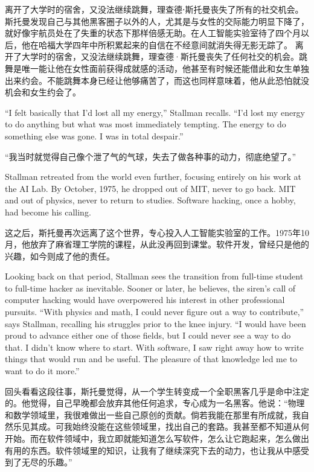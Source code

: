 \ifdefined\chs
\ifdefined\vone
离开了大学时的宿舍，又没法继续跳舞，理查德⋅斯托曼丧失了所有的社交机会。斯托曼发现自己与其他黑客圈子以外的人，尤其是与女性的交际能力明显下降了，就好像宇航员处在了失重的状态下那样倍感无助。在人工智能实验室待了四个月以后，他在哈福大学四年中所积累起来的自信在不经意间就消失得无影无踪了。
\fi
\ifdefined\vtwo
离开了大学时的宿舍，又没法继续跳舞，理查德·斯托曼丧失了任何社交的机会。跳舞是唯一能让他在女性面前获得成就感的活动，他甚至有时候还能借此和女生单独出来约会。不能跳舞本身已经让他够痛苦了，而这也同样意味着，他从此恐怕就没机会和女生约会了。
\fi
\fi

\ifdefined\eng
``I felt basically that I'd lost all my energy,'' Stallman recalls. ``I'd lost my energy to do anything but what was most immediately tempting. The energy to do something else was gone. I was in total despair.''
\fi

\ifdefined\chs
``我当时就觉得自己像个泄了气的气球，失去了做各种事的动力，彻底绝望了。''
\fi

\ifdefined\eng
Stallman retreated from the world even further, focusing entirely on his work at the AI Lab. By October, 1975, he dropped out of \ifdefined\vone MIT, never to go back. \fi\ifdefined\vtwo MIT and out of physics, never to return to studies. \fi Software hacking, once a hobby, had become his calling.
\fi

\ifdefined\chs
这之后，斯托曼再次远离了这个世界，专心投入人工智能实验室的工作。1975年10月，他放弃了麻省理工学院的课程，从此没再回到课堂。软件开发，曾经只是他的兴趣，如今则成了他的责任。
\fi

\ifdefined\eng
Looking back on that period, Stallman sees the transition from full-time student to full-time hacker as inevitable. Sooner or later, he believes, the siren's call of computer hacking would have overpowered his interest in other professional pursuits. ``With physics and math, I could never figure out a way to contribute,'' says Stallman, recalling his struggles prior to the knee injury. ``I would have been proud to advance either one of those fields, but I could never see a way to do that. I didn't know where to start. With software, I saw right away how to write things that would run and be useful. The pleasure of that knowledge led me to want to do it more.''
\fi

\ifdefined\chs
回头看看这段往事，斯托曼觉得，从一个学生转变成一个全职黑客几乎是命中注定的。他觉得，自己早晚都会放弃其他任何追求，专心成为一名黑客。他说：``物理和数学领域里，我很难做出一些自己原创的贡献。倘若我能在那里有所成就，我自然乐见其成。可我始终没能在这些领域里，找出自己的套路。我甚至都不知道从何开始。而在软件领域中，我立即就能知道怎么写软件，怎么让它跑起来，怎么做出有用的东西。软件领域里的知识，让我有了继续深究下去的动力，也让我从中感受到了无尽的乐趣。''
\fi


